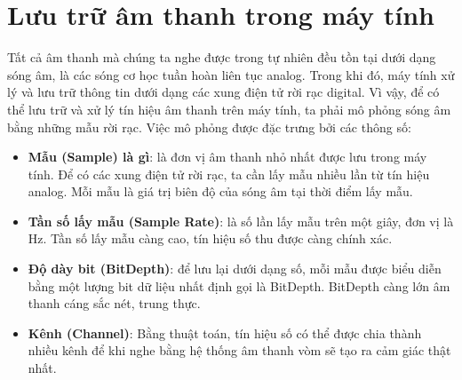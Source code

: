 \section{Lưu trữ âm thanh trong máy tính}
Tất cả âm thanh mà chúng ta nghe được trong tự nhiên đều tồn tại dưới dạng sóng âm, là các sóng cơ học tuần hoàn liên tục analog. Trong khi đó, máy tính xử lý và lưu trữ thông tin dưới dạng các xung điện tử rời rạc digital. Vì vậy, để có thể lưu trữ và xử lý tín hiệu âm thanh trên máy tính, ta phải mô phỏng sóng âm bằng những mẫu rời rạc. Việc mô phỏng được đặc trưng bởi các thông số:
\begin{itemize}
	\item \textbf{Mẫu (Sample) là gì}: là đơn vị âm thanh nhỏ nhất được lưu trong máy tính. Để có các xung điện tử rời rạc, ta cần lấy mẫu nhiều lần từ tín hiệu analog. Mỗi mẫu là giá trị biên độ của sóng âm tại thời điểm lấy mẫu.
	\item \textbf{Tần số lấy mẫu (Sample Rate)}: là số lần lấy mẫu trên một giây, đơn vị là Hz. Tần số lấy mẫu càng cao, tín hiệu số thu được càng chính xác.
	\item \textbf{Độ dày bit (BitDepth)}: để lưu lại dưới dạng số, mỗi mẫu được biểu diễn bằng một lượng bit dữ liệu nhất định gọi là BitDepth. BitDepth càng lớn âm thanh cáng sắc nét, trung thực.
	\item \textbf{Kênh (Channel)}: Bằng thuật toán, tín hiệu số có thể được chia thành nhiều kênh để khi nghe bằng hệ thống âm thanh vòm sẽ tạo ra cảm giác thật nhất.
\end{itemize}

